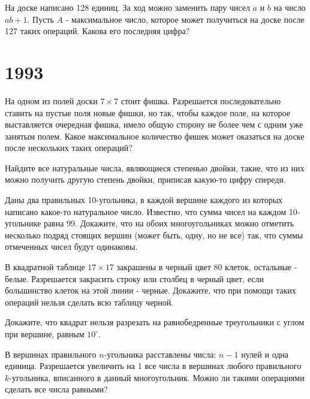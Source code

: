 \documentclass[11pt, a4paper]{common/document_template}
\begin{document}
\begin{exercise}[49]
На доске написано 128 единиц. За ход можно заменить пару чисел $a$ и $b$ на число $ab+1$. Пусть $A$ - максимальное число, которое может получиться на доске после 127 таких операций. Какова его последняя цифра?
\end{exercise}


\chapter{1993}

\begin{exercise}[20]
На одном из полей доски $7 \times 7$ стоит фишка. Разрешается последовательно ставить на пустые поля новые фишки, но так, чтобы каждое поле, на которое выставляется очередная фишка, имело общую сторону не более чем с одним уже занятым полем. Какое максимальное количество фишек может оказаться на доске после нескольких таких операций?
\end{exercise}

\begin{exercise}[21]
Найдите все натуральные числа, являющиеся степенью двойки, такие, что из них можно получить другую степень двойки, приписав какую-то цифру спереди.
\end{exercise}

\begin{exercise}[27]
Даны два правильных 10-угольника, в каждой вершине каждого из которых написано какое-то натуральное число. Известно, что сумма чисел на каждом 10-угольнике равна 99. Докажите, что на обоих многоугольниках можно отметить несколько подряд стоящих вершин (может быть, одну, но не все) так, что суммы отмеченных чисел будут одинаковы.
\end{exercise}

\begin{exercise}[33]
В квадратной таблице $17 \times 17$ закрашены в черный цвет 80 клеток, остальные - белые. Разрешается закрасить строку или столбец в черный цвет, если большинство клеток на этой линии - черные. Докажите, что при помощи таких операций нельзя сделать всю таблицу черной.
\end{exercise}

\begin{exercise}[45]
Докажите, что квадрат нельзя разрезать на равнобедренные треугольники с углом при вершине, равным $10^{\circ}$.
\end{exercise}

\begin{exercise}[56]
В вершинах правильного $n$-угольника расставлены числа: $n - 1$ нулей и одна единица. Разрешается увеличить на 1 все числа в вершинах любого правильного $k$-угольника, вписанного в данный многоугольник. Можно ли такими операциями сделать все числа равными?
\end{exercise}
\end{document}
